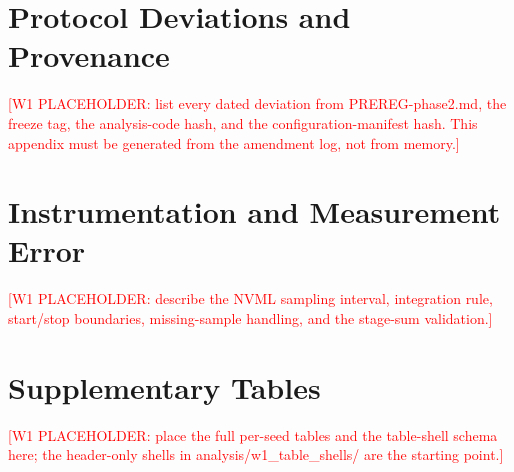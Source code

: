 \documentclass[preprint,12pt]{elsarticle}
\newcommand{\wone}[1]{\textcolor{red}{[W1 PLACEHOLDER: #1]}}
\begin{document}
\appendix

\section{Protocol Deviations and Provenance}
\wone{list every dated deviation from PREREG-phase2.md, the freeze tag, the
analysis-code hash, and the configuration-manifest hash.  This appendix must
be generated from the amendment log, not from memory.}

\section{Instrumentation and Measurement Error}
\wone{describe the NVML sampling interval, integration rule, start/stop
boundaries, missing-sample handling, and the stage-sum validation.}

\section{Supplementary Tables}
\wone{place the full per-seed tables and the table-shell schema here; the
header-only shells in analysis/w1\_table\_shells/ are the starting point.}
\end{document}
